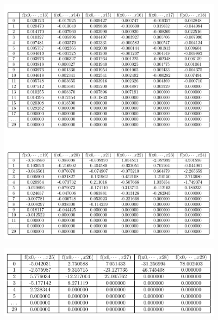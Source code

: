 \documentclass[a4paper, 12pt]{article}
\begin{document}
\begin{figure}[ht]
	\centering
	\includegraphics[width=1\linewidth]{./img/t13-4.png}
\end{figure}

\begin{figure}[ht]
	\centering
	\includegraphics[width=1\linewidth]{./img/t15.png}
\end{figure}

\clearpage
\newpage
\end{document}
